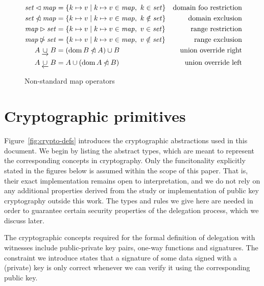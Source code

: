 \documentclass[11pt,a4paper]{article}
\theoremstyle{definition}
\theoremstyle{definition}
\begin{document}
\begin{figure}
  \begin{align*}
    \mathit{set} \lhd \mathit{map}
    & = \{ k \mapsto v \mid k \mapsto v \in \mathit{map}, ~ k \in \mathit{set} \}
    & \text{domain foo restriction}
    \\
    \mathit{set} \mathbin{\slashed{\lhd}} \mathit{map}
    & = \{ k \mapsto v \mid k \mapsto v \in \mathit{map}, ~ k \notin \mathit{set} \}
    & \text{domain exclusion}
    \\
    \mathit{map} \rhd \mathit{set}
    & = \{ k \mapsto v \mid k \mapsto v \in \mathit{map}, ~ v \in \mathit{set} \}
    & \text{range restriction}
    \\
    \mathit{map} \mathbin{\slashed{\rhd}} \mathit{set}
    & = \{ k \mapsto v \mid k \mapsto v \in \mathit{map}, ~ v \notin \mathit{set} \}
    & \text{range exclusion}
    \\
    A \mathbin{\underrightarrow\cup} B
    & = (\operatorname{dom} B \mathbin{\slashed{\lhd}} A)\cup B
    & \text{union override right}
    \\
    A \mathbin{\underleftarrow\cup} B
    & = A \cup (\operatorname{dom} A \mathbin{\slashed{\lhd}} B)
    & \text{union override left}
  \end{align*}
  \caption{Non-standard map operators}
  \label{fig:notation:nonstandard}
\end{figure}

\section{Cryptographic primitives}
\label{sec:crypto-primitives}


Figure~\ref{fig:crypto-defs} introduces the cryptographic abstractions used in
this document. We begin by listing the abstract types, which are meant to
represent the corresponding concepts in cryptography. Only the funcitonality
explicitly stated in the figures below is assumed within the scope of this paper.
That is, their exact
implementation remains open to interpretation, and we do not rely on
any additional properties derived from the study or implementation of public key
cryptography outside this work. The types and rules we give here are needed in
order to guarantee certain security properties of the delegation process, which
we discuss later.

The cryptographic concepts required for the formal definition
of delegation with witnesses include public-private key pairs, one-way functions
and signatures. The constraint we introduce states that a signature of
some data signed with a (private) key is only correct whenever we can verify
it using the corresponding public key.
\end{document}
